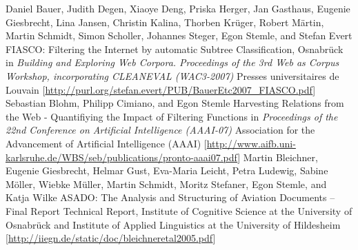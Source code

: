 \documentclass[11pt,a4paper]{moderncv}
\begin{document}
        {Daniel Bauer, Judith Degen, Xiaoye Deng, Priska Herger, Jan Gasthaus,
        Eugenie Giesbrecht, Lina Jansen, Christin Kalina, Thorben Kr{\"u}ger,
        Robert M{\"a}rtin, Martin Schmidt, Simon Scholler, Johannes Steger,
        Egon Stemle, and Stefan Evert}
        {FIASCO: Filtering the Internet by automatic Subtree Classification,
        Osnabr{\"u}ck}
        {\small in {\em Building and Exploring Web Corpora. Proceedings of the
        3rd Web as Corpus Workshop, incorporating CLEANEVAL (WAC3-2007)}}
        {\small Presses universitaires de Louvain}
        {[\url{http://purl.org/stefan.evert/PUB/BauerEtc2007_FIASCO.pdf}]}
        {Sebastian Blohm, Philipp Cimiano, and Egon Stemle}
        {Harvesting Relations from the Web - Quantifiying the Impact of
        Filtering Functions}
        {\small in {\em Proceedings of the 22nd Conference on Artificial
        Intelligence (AAAI-07)}}
        {\small Association for the Advancement of Artificial Intelligence
        (AAAI)}
        {[\url{http://www.aifb.uni-karlsruhe.de/WBS/seb/publications/pronto-aaai07.pdf}]}
        {Martin Bleichner, Eugenie Giesbrecht, Helmar Gust, Eva-Maria Leicht,
        Petra Ludewig, Sabine M{\"o}ller, Wiebke M{\"u}ller, Martin Schmidt,
        Moritz Stefaner, Egon Stemle, and Katja Wilke}
        {ASADO: The Analysis and Structuring of Aviation Documents -- Final Report}
        {\small Technical Report, Institute of Cognitive Science at the
        University of Osnabr{\"u}ck and Institute of Applied Linguistics at the
        University of Hildesheim}
        {}
        {[\url{http://iiegn.de/static/doc/bleichneretal2005.pdf}]}
\closesection{}


\end{document}
